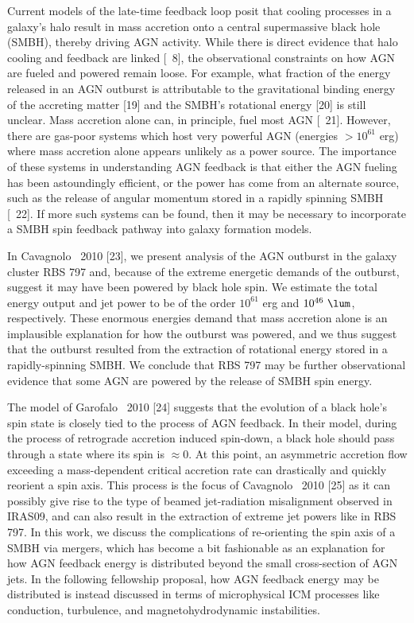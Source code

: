 \documentclass[letterpaper,12pt]{article}
\begin{document}
 Current models of the late-time
feedback loop posit that cooling processes in a galaxy's halo result
in mass accretion onto a central supermassive black hole (SMBH),
thereby driving AGN activity. While there is direct evidence that halo
cooling and feedback are linked [\eg\ 8], the observational
constraints on how AGN are fueled and powered remain loose. For
example, what fraction of the energy released in an AGN outburst is
attributable to the gravitational binding energy of the accreting
matter [19] and the SMBH's rotational energy [20] is still
unclear. Mass accretion alone can, in principle, fuel most AGN
[\eg\ 21]. However, there are gas-poor systems which host very
powerful AGN (energies $> 10^{61}$ erg) where mass accretion alone
appears unlikely as a power source. The importance of these systems in
understanding AGN feedback is that either the AGN fueling has been
astoundingly efficient, or the power has come from an alternate
source, such as the release of angular momentum stored in a rapidly
spinning SMBH [\eg\ 22]. If more such systems can be found, then it
may be necessary to incorporate a SMBH spin feedback pathway into
galaxy formation models.

In Cavagnolo \etal\ 2010 [23], we present analysis of the AGN outburst
in the galaxy cluster RBS 797 and, because of the extreme energetic
demands of the outburst, suggest it may have been powered by black
hole spin. We estimate the total energy output and jet power to be of
the order $10^{61}$ erg and $10^{46} ~\lum$, respectively. These
enormous energies demand that mass accretion alone is an implausible
explanation for how the outburst was powered, and we thus suggest that
the outburst resulted from the extraction of rotational energy stored
in a rapidly-spinning SMBH. We conclude that RBS 797 may be further
observational evidence that some AGN are powered by the release of
SMBH spin energy.

The model of Garofalo \etal\ 2010 [24] suggests that the evolution of
a black hole's spin state is closely tied to the process of AGN
feedback. In their model, during the process of retrograde accretion
induced spin-down, a black hole should pass through a state where its
spin is $\approx 0$. At this point, an asymmetric accretion flow
exceeding a mass-dependent critical accretion rate can drastically and
quickly reorient a spin axis. This process is the focus of Cavagnolo
\etal\ 2010 [25] as it can possibly give rise to the type of beamed
jet-radiation misalignment observed in IRAS09, and can also result in
the extraction of extreme jet powers like in RBS 797. In this work, we
discuss the complications of re-orienting the spin axis of a SMBH via
mergers, which has become a bit fashionable as an explanation for how
AGN feedback energy is distributed beyond the small cross-section of
AGN jets. In the following fellowship proposal, how AGN feedback
energy may be distributed is instead discussed in terms of
microphysical ICM processes like conduction, turbulence, and
magnetohydrodynamic instabilities.
\end{document}
